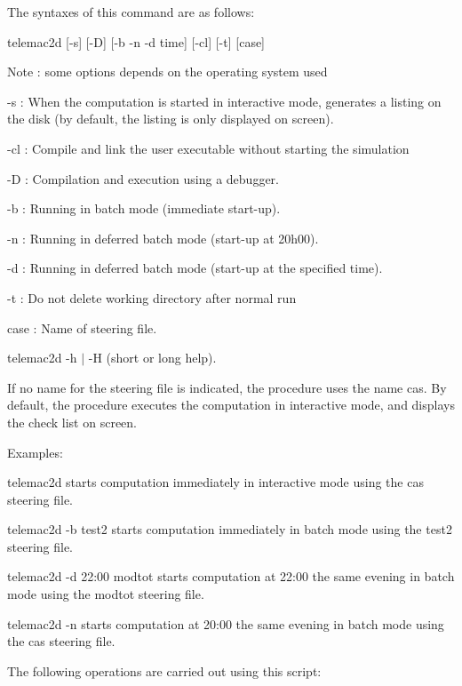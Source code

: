\documentclass{article} %
\begin{document}
 The syntaxes of this command are as follows:

 telemac2d [-s] [-D] [-b {\textbar} -n {\textbar} -d time] [-cl] [-t] [case]

 Note : some options depends on the operating system used



 -s : When the computation is started in interactive mode, generates a listing on the disk (by default, the listing is only displayed on screen).

 -cl : Compile and link the user executable without starting the simulation

 -D : Compilation and execution using a debugger.

 -b : Running in batch mode (immediate start-up).

 -n : Running in deferred batch mode (start-up at 20h00).

 -d : Running in deferred batch mode (start-up at the specified time).

 -t : Do not delete working directory after normal run

 case : Name of steering file.



  telemac2d  -h $\mid$ -H  (short or long help).





 If no name for the steering file is indicated, the procedure uses the name cas. By default, the procedure executes the computation in interactive mode, and displays the check list on screen.

 Examples:

 telemac2d starts computation immediately in interactive mode using the cas steering file.

 telemac2d -b test2 starts computation immediately in batch mode using the test2 steering file.

 telemac2d -d 22:00 modtot starts computation at 22:00 the same evening in batch mode using the modtot steering file.

 telemac2d -n starts computation at 20:00 the same evening in batch mode using the cas steering file.



 The following operations are carried out using this script:
\end{document}
